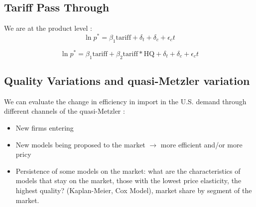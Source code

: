 \subsection{Tariff Pass Through}

\begin{table}[H]
    \centering
    \caption{Caption}
    
    \label{tab:my_label}
\end{table}

We are at the product level : 
\begin{equation}
    \ln p^* = \beta_1 \text{tariff} + \delta_t + \delta_c +\epsilon_ct 
\end{equation}

\begin{equation} 
    \ln p^* = \beta_1 \text{tariff} + \beta_2 \text{tariff}*\text{HQ} + \delta_t + \delta_c +\epsilon_ct 
\end{equation}

\subsection{Quality Variations and quasi-Metzler variation}

We can evaluate the change in efficiency in import in the U.S. demand through different channels of the quasi-Metzler :
\begin{itemize}
    \item New firms entering
    \item New models being proposed to the market $\longrightarrow$ more efficient and/or more pricy
    \item Persistence of some models on the market: what are the characteristics of models that stay on the market, those with the lowest price elasticity, the highest quality? (Kaplan-Meier, Cox Model), market share by segment of the market.
\end{itemize}
